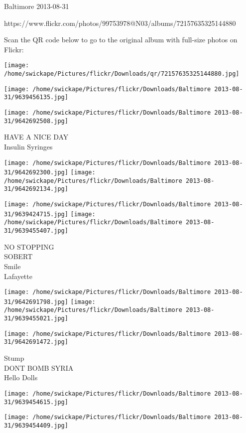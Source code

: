 \documentclass[10pt,letterpaper]{article}
\begin{document}
Baltimore 2013-08-31

https://www.flickr.com/photos/99753978@N03/albums/72157635325144880

Scan the QR code below to go to the original album with full-size photos on Flickr:

\texttt{[image: /home/swickape/Pictures/flickr/Downloads/qr/72157635325144880.jpg]}
\pagebreak

\texttt{[image: /home/swickape/Pictures/flickr/Downloads/Baltimore 2013-08-31/9639456135.jpg]}

\vspace{0.25in}
\texttt{[image: /home/swickape/Pictures/flickr/Downloads/Baltimore 2013-08-31/9642692508.jpg]}

HAVE A NICE DAY\\
Insulin Syringes\\
\pagebreak

\texttt{[image: /home/swickape/Pictures/flickr/Downloads/Baltimore 2013-08-31/9642692300.jpg]}
\texttt{[image: /home/swickape/Pictures/flickr/Downloads/Baltimore 2013-08-31/9642692134.jpg]}

\texttt{[image: /home/swickape/Pictures/flickr/Downloads/Baltimore 2013-08-31/9639424715.jpg]}
\texttt{[image: /home/swickape/Pictures/flickr/Downloads/Baltimore 2013-08-31/9639455407.jpg]}

NO STOPPING\\
SOBERT\\
Smile\\
Lafayette\\
\pagebreak

\texttt{[image: /home/swickape/Pictures/flickr/Downloads/Baltimore 2013-08-31/9642691798.jpg]}
\texttt{[image: /home/swickape/Pictures/flickr/Downloads/Baltimore 2013-08-31/9639455021.jpg]}

\texttt{[image: /home/swickape/Pictures/flickr/Downloads/Baltimore 2013-08-31/9642691472.jpg]}

Stump\\
DONT BOMB SYRIA\\
Hello Dolls\\
\pagebreak

\texttt{[image: /home/swickape/Pictures/flickr/Downloads/Baltimore 2013-08-31/9639454615.jpg]}

\vspace{0.25in}
\texttt{[image: /home/swickape/Pictures/flickr/Downloads/Baltimore 2013-08-31/9639454409.jpg]}
\end{document}
